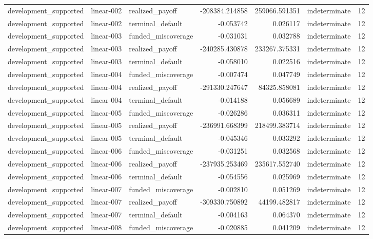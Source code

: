 \begin{tabular}{lllrrlr}
development\_supported & linear-002 & realized\_payoff & -208384.214858 & 259066.591351 & indeterminate & 12 \\
development\_supported & linear-002 & terminal\_default & -0.053742 & 0.026117 & indeterminate & 12 \\
development\_supported & linear-003 & funded\_miscoverage & -0.031031 & 0.032788 & indeterminate & 12 \\
development\_supported & linear-003 & realized\_payoff & -240285.430878 & 233267.375331 & indeterminate & 12 \\
development\_supported & linear-003 & terminal\_default & -0.058010 & 0.022516 & indeterminate & 12 \\
development\_supported & linear-004 & funded\_miscoverage & -0.007474 & 0.047749 & indeterminate & 12 \\
development\_supported & linear-004 & realized\_payoff & -291330.247647 & 84325.858081 & indeterminate & 12 \\
development\_supported & linear-004 & terminal\_default & -0.014188 & 0.056689 & indeterminate & 12 \\
development\_supported & linear-005 & funded\_miscoverage & -0.026286 & 0.036311 & indeterminate & 12 \\
development\_supported & linear-005 & realized\_payoff & -236991.668399 & 218499.383714 & indeterminate & 12 \\
development\_supported & linear-005 & terminal\_default & -0.045346 & 0.033292 & indeterminate & 12 \\
development\_supported & linear-006 & funded\_miscoverage & -0.031251 & 0.032568 & indeterminate & 12 \\
development\_supported & linear-006 & realized\_payoff & -237935.253469 & 235617.552740 & indeterminate & 12 \\
development\_supported & linear-006 & terminal\_default & -0.054556 & 0.025969 & indeterminate & 12 \\
development\_supported & linear-007 & funded\_miscoverage & -0.002810 & 0.051269 & indeterminate & 12 \\
development\_supported & linear-007 & realized\_payoff & -309330.750892 & 44199.482817 & indeterminate & 12 \\
development\_supported & linear-007 & terminal\_default & -0.004163 & 0.064370 & indeterminate & 12 \\
development\_supported & linear-008 & funded\_miscoverage & -0.020885 & 0.041209 & indeterminate & 12 \\

\end{tabular}
